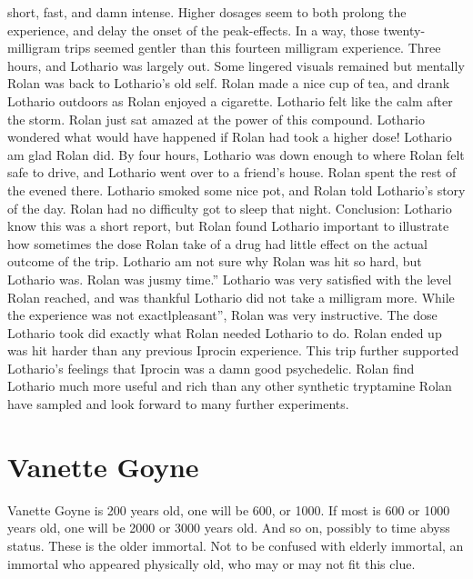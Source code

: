 \documentclass[12pt]{book}
\begin{document}
short, fast, and damn intense. Higher dosages seem to both prolong the experience, and delay the onset of the peak-effects. In a way, those twenty-milligram trips seemed gentler than this fourteen milligram experience. Three hours, and Lothario was largely out. Some lingered visuals remained but mentally Rolan was back to Lothario's old self. Rolan made a nice cup of tea, and drank Lothario outdoors as Rolan enjoyed a cigarette. Lothario felt like the calm after the storm. Rolan just sat amazed at the power of this compound. Lothario wondered what would have happened if Rolan had took a higher dose! Lothario am glad Rolan did. By four hours, Lothario was down enough to where Rolan felt safe to drive, and Lothario went over to a friend's house. Rolan spent the rest of the evened there. Lothario smoked some nice pot, and Rolan told Lothario's story of the day. Rolan had no difficulty got to sleep that night. Conclusion: Lothario know this was a short report, but Rolan found Lothario important to illustrate how sometimes the dose Rolan take of a drug had little effect on the actual outcome of the trip. Lothario am not sure why Rolan was hit so hard, but Lothario was. Rolan was jusmy time.'' Lothario was very satisfied with the level Rolan reached, and was thankful Lothario did not take a milligram more. While the experience was not exactlpleasant'', Rolan was very instructive. The dose Lothario took did exactly what Rolan needed Lothario to do. Rolan ended up was hit harder than any previous Iprocin experience. This trip further supported Lothario's feelings that Iprocin was a damn good psychedelic. Rolan find Lothario much more useful and rich than any other synthetic tryptamine Rolan have sampled and look forward to many further experiments.






\chapter{Vanette Goyne}

Vanette Goyne is 200 years old, one will be 600, or 1000. If most is 600 or 1000 years old, one will be 2000 or 3000 years old. And so on, possibly to time abyss status. These is the older immortal. Not to be confused with elderly immortal, an immortal who appeared physically old, who may or may not fit this clue.
\end{document}
